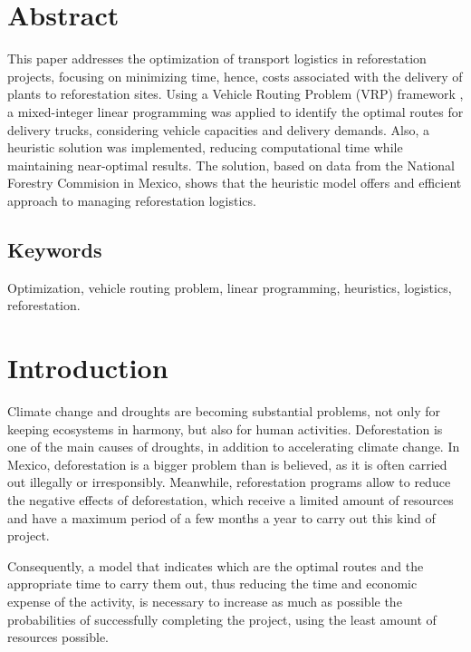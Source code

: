 \documentclass{amsart}
\begin{document}

\section*{Abstract}
    This paper addresses the optimization of transport logistics in reforestation projects, focusing on minimizing time, hence, costs associated with the delivery of plants to reforestation sites. Using a Vehicle Routing Problem (VRP) framework \parencite{Toth2002}, a mixed-integer linear programming was applied to identify the optimal routes for delivery trucks, considering vehicle capacities and delivery demands. Also, a heuristic solution was implemented, reducing computational time while maintaining near-optimal results. The solution, based on data from the National Forestry Commision in Mexico, shows that the heuristic model offers and efficient approach to managing reforestation logistics.
    
{\subsection*{Keywords} Optimization, vehicle routing problem, linear programming, heuristics, logistics, reforestation.}



    \section{Introduction}
        Climate change and droughts are becoming substantial problems, not only for keeping ecosystems in harmony, but also for human activities. Deforestation is one of the main causes of droughts, in addition to accelerating climate change. In Mexico, deforestation is a bigger problem than is believed, as it is often carried out illegally or irresponsibly. Meanwhile, reforestation programs allow to reduce the negative effects of deforestation, which receive a limited amount of resources and have a maximum period of a few months a year to carry out this kind of project.

         Consequently, a model that indicates which are the optimal routes and the appropriate time to carry them out, thus reducing the time and economic expense of the activity, is necessary to increase as much as possible the probabilities of successfully completing the project, using the least amount of resources possible.
         
\end{document}
